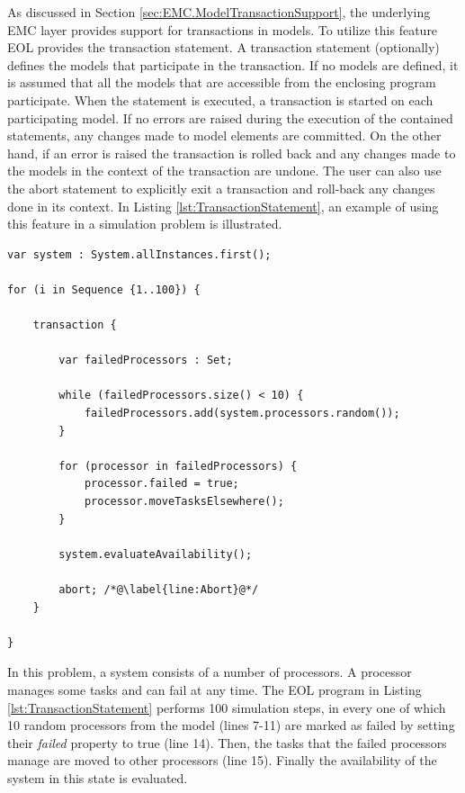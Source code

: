 As discussed in Section \ref{sec:EMC.ModelTransactionSupport}, the underlying EMC layer provides support for transactions in models. To utilize this feature EOL provides the transaction statement. A transaction statement (optionally) defines the models that participate in the transaction. If no models are defined, it is assumed that all the models that are accessible from the enclosing program participate. When the statement is executed, a transaction is started on each participating model. If no errors are raised during the execution of the contained statements, any changes made to model elements are committed. On the other hand, if an error is raised the transaction is rolled back and any changes made to the models in the context of the transaction are undone. The user can also use the abort statement to explicitly exit a transaction and roll-back any changes done in its context. In Listing \ref{lst:TransactionStatement}, an example of using this feature in a simulation problem is illustrated.

\begin{lstlisting}[float=h, caption=Example of a transaction statement, label=lst:TransactionStatement, language=EOL]
var system : System.allInstances.first();

for (i in Sequence {1..100}) {

    transaction {
    
        var failedProcessors : Set; 
        
        while (failedProcessors.size() < 10) {
            failedProcessors.add(system.processors.random());
        }
        
        for (processor in failedProcessors) {
            processor.failed = true;
            processor.moveTasksElsewhere();
        }
        
        system.evaluateAvailability();
        
        abort; /*@\label{line:Abort}@*/
    }

}
\end{lstlisting}

In this problem, a system consists of a number of processors. A processor manages some tasks and can fail at any time. The EOL program in Listing \ref{lst:TransactionStatement} performs 100 simulation steps, in every one of which 10 random processors from the model (lines 7-11) are marked as failed by setting their \emph{failed} property to true (line 14). Then, the tasks that the failed processors manage are moved to other processors (line 15). Finally the availability of the system in this state is evaluated.

